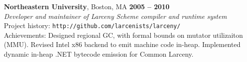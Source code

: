 \documentclass[margin,line,draft]{res}
\def\noneed#1{}
\begin{document}
\begin{resume}
    \textbf{Northeastern University}, Boston, MA \hfill \textbf{2005 -- 2010}\\\vspace{1mm}%
    \textsl{Developer and maintainer of Larceny Scheme compiler and runtime system} \\
    Project history: {\tt http://github.com/larcenists/larceny/}\\
    Achievements: Designed regional GC, with formal bounds on mutator utilizaiton (MMU). Revised Intel x86 backend to emit machine code in-heap.
    Implemented dynamic in-heap .NET bytecode emission for Common Larceny.
    \vspace{-2mm}
% 
% 
% 
% 
% 


\end{resume}
\end{document}
